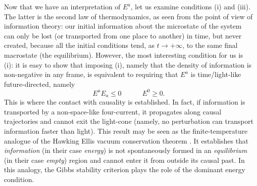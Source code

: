 \documentclass[aps,prl,reprint,nofootinbib]{revtex4-1}
\newcommand{\spc}{\quad \quad \quad}
\begin{document}
Now that we have an interpretation of $E^a$, let us examine conditions (i) and (iii). The latter is the second law of thermodynamics, as seen from the point of view of information theory: our initial information about the microstate of the system can only be lost (or transported from one place to another) in time, but never created, because all the initial conditions tend, as $t \rightarrow +\infty$, to the same final macrostate (the equilibrium). However, the most interesting condition for us is (i): it is easy to show that imposing (i), namely that the density of information is non-negative in any frame, is equivalent to requiring that $E^a$ is time/light-like future-directed, namely
\begin{equation}
E^a E_a \leq 0  \spc E^0 \geq 0.
\end{equation}
This is where the contact with causality is established. In fact, if information is transported by a non-space-like four-current, it propagates along causal trajectories and cannot exit the light-cone (namely, no perturbation can transport information faster than light). This result may be seen as the finite-temperature analogue of the Hawking Ellis vacuum conservation theorem \cite{Hawking1973,CarterVacuum2003}. It establishes that \textit{information} (in their case \textit{energy}) is not spontaneously formed in an \textit{equilibrium} (in their case \textit{empty}) region and cannot enter it from outside its causal past. In this analogy, the Gibbs stability criterion plays the role of the dominant energy condition.
\end{document}

